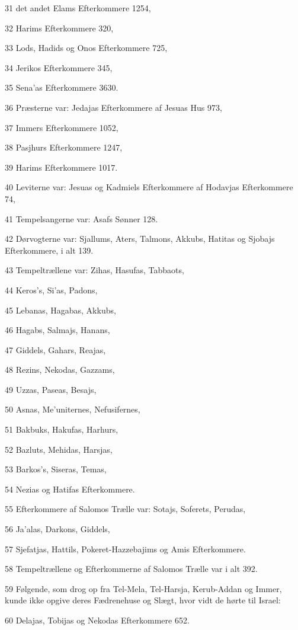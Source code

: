 \par 31 det andet Elams Efterkommere 1254,
\par 32 Harims Efterkommere 320,
\par 33 Lods, Hadids og Onos Efterkommere 725,
\par 34 Jerikos Efterkommere 345,
\par 35 Sena'as Efterkommere 3630.
\par 36 Præsterne var: Jedajas Efterkommere af Jesuas Hus 973,
\par 37 Immers Efterkommere 1052,
\par 38 Pasjhurs Efterkommere 1247,
\par 39 Harims Efterkommere 1017.
\par 40 Leviterne var: Jesuas og Kadmiels Efterkommere af Hodavjas Efterkommere 74,
\par 41 Tempelsangerne var: Asafs Sønner 128.
\par 42 Dørvogterne var: Sjallums, Aters, Talmons, Akkubs, Hatitas og Sjobajs Efterkommere, i alt 139.
\par 43 Tempeltrællene var: Zihas, Hasufas, Tabbaots,
\par 44 Keros's, Si'as, Padons,
\par 45 Lebanas, Hagabas, Akkubs,
\par 46 Hagabs, Salmajs, Hanans,
\par 47 Giddels, Gahars, Reajas,
\par 48 Rezins, Nekodas, Gazzams,
\par 49 Uzzas, Paseas, Besajs,
\par 50 Asnas, Me'uniternes, Nefusifernes,
\par 51 Bakbuks, Hakufas, Harhurs,
\par 52 Bazluts, Mehidas, Harsjas,
\par 53 Barkos's, Siseras, Temas,
\par 54 Nezias og Hatifas Efterkommere.
\par 55 Efterkommere af Salomos Trælle var: Sotajs, Soferets, Perudas,
\par 56 Ja'alas, Darkons, Giddels,
\par 57 Sjefatjas, Hattils, Pokeret-Hazzebajims og Amis Efterkommere.
\par 58 Tempeltrællene og Efterkommerne af Salomos Trælle var i alt 392.
\par 59 Følgende, som drog op fra Tel-Mela, Tel-Harsja, Kerub-Addan og Immer, kunde ikke opgive deres Fædrenehuse og Slægt, hvor vidt de hørte til Israel:
\par 60 Delajas, Tobijas og Nekodas Efterkommere 652.
